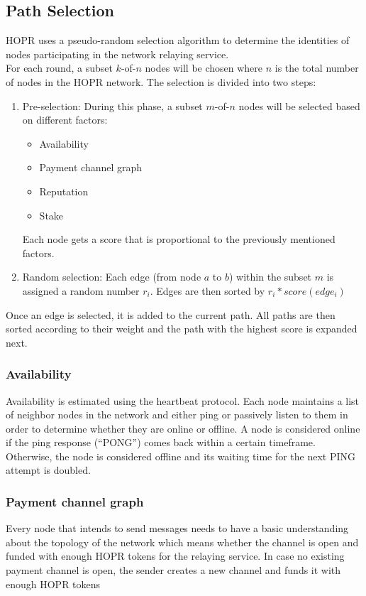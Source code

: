 \subsection{Path Selection}
HOPR uses a pseudo-random selection algorithm to determine the identities of nodes participating in the network relaying service.
\\For each round, a subset $k$-of-$n$ nodes will be chosen where $n$ is the total number of nodes in the HOPR network. The selection is divided into two steps:
\begin{enumerate}
    \item Pre-selection: 
    During this phase, a subset $m$-of-$n$ nodes will be selected based on different factors:
    \begin{itemize}
        \item Availability
        \item Payment channel graph
        \item Reputation
        \item Stake
    \end{itemize}
Each node gets a score that is proportional to the previously mentioned factors.
\item Random selection: 
Each edge (from node $a$ to $b$) within the subset $m$ is assigned a random number $r_i$. Edges are then sorted by $r_i*score(edge_i)$
\end{enumerate}
Once an edge is selected, it is added to the current path. All paths are then sorted according to their weight and the path with the highest score is expanded next.


\subsubsection{Availability}
Availability is estimated using the heartbeat protocol.
Each node maintains a list of neighbor nodes in the network and either ping or passively listen to them in order to determine whether they are online or offline.
A node is considered online if the ping response (“PONG”) comes back within a certain timeframe. Otherwise, the node is considered offline and its waiting time for the next PING attempt is doubled.


\subsubsection{Payment channel graph}
Every node that intends to send messages needs to have a basic understanding about the topology of the network which means whether the channel is open and funded with enough HOPR tokens for the relaying service. In case no existing payment channel is open, the sender creates a new channel and funds it with enough HOPR tokens

